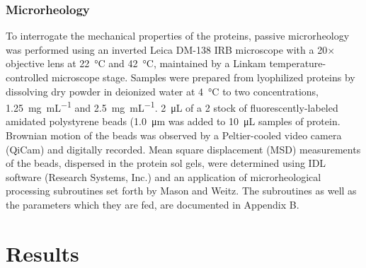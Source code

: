 \begin{refsection}
\subsubsection{Microrheology}

To interrogate the mechanical properties of the proteins, passive microrheology
was performed using an inverted Leica DM-138 IRB microscope with a 20$\times$
objective lens at \SI{22}{\celsius} and \SI{42}{\celsius}, maintained by a
Linkam temperature-controlled microscope stage. Samples were prepared from
lyophilized proteins by dissolving dry powder in deionized water at
\SI{4}{\celsius} to two concentrations, \SI{1.25}{\mg\per\mL} and
\SI{2.5}{\mg\per\mL}. \SI{2}{\uL} of a \SI{2}{\wtper} stock of
fluorescently-labeled amidated polystyrene beads (\SI{1.0}{\um} was added to
\SI{10}{\uL} samples of protein. Brownian motion of the beads was observed by a
Peltier-cooled video camera (QiCam) and digitally recorded.  Mean square
displacement (MSD) measurements of the beads, dispersed in the protein sol gels,
were determined using IDL software (Research Systems, Inc.) and an application
of microrheological processing subroutines set forth by Mason and
Weitz.\cite{Mason1997} The subroutines as well as the parameters which they are
fed, are documented in Appendix B. 

\section{Results}


\end{refsection}
